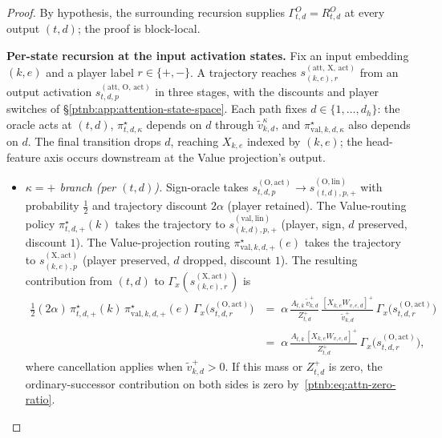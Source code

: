 \begin{proof}
By hypothesis, the surrounding recursion supplies $\Gamma^{O}_{t,d} = R^{O}_{t,d}$ at every
output $(t,d)$; the proof is block-local.

\textbf{Per-state recursion at the input activation states.} Fix an input embedding $(k,e)$ and a
player label $r \in \{+,-\}$. A trajectory reaches
$s_{(k,e),r}^{(\mathrm{att},\,\mathrm{X},\,\mathrm{act})}$ from an output activation
$s_{t,d,p}^{(\mathrm{att},\,\mathrm{O},\,\mathrm{act})}$ in three stages, with the discounts and player switches of
\S\ref{ptnb:app:attention-state-space}. Each path fixes $d \in \{1,\dots,d_h\}$:
the oracle acts at $(t,d)$, $\pi_{t,d,\kappa}^\star$ depends on $d$ through
$\tilde{v}_{k,d}^\kappa$, and $\pi_{\mathrm{val},k,d,\kappa}^\star$ also depends on $d$.
The final transition drops $d$, reaching $X_{k,e}$ indexed by $(k,e)$;
the head-feature axis occurs downstream at the Value projection's output.
\begin{itemize}
    \item \emph{$\kappa = +$ branch (per $(t,d)$).} Sign-oracle takes $s_{t,d,p}^{(\mathrm{O},\mathrm{act})}
            \to s_{(t,d),p,+}^{(\mathrm{O},\mathrm{lin})}$ with probability $\tfrac12$ and trajectory discount
        $2\alpha$ (player retained). The Value-routing policy $\pi_{t,d,+}^\star(k)$ takes the trajectory
        to $s_{(k,d),p,+}^{(\mathrm{val},\mathrm{lin})}$ (player, sign, $d$ preserved, discount $1$). The
        Value-projection routing $\pi_{\mathrm{val},k,d,+}^\star(e)$ takes the trajectory to
        $s_{(k,e),p}^{(\mathrm{X},\mathrm{act})}$ (player preserved, $d$ dropped, discount $1$). The resulting contribution from $(t,d)$ to $\Gamma_x(s_{(k,e),r}^{(\mathrm{X},\mathrm{act})})$ is
        \begin{align}
            \tfrac12 (2\alpha)\, \pi_{t,d,+}^\star(k)\, \pi_{\mathrm{val},k,d,+}^\star(e)\,
            \Gamma_x\!\bigl(s_{t,d,r}^{(\mathrm{O},\mathrm{act})}\bigr)
            &=\; \alpha\, \frac{A_{t,k}\, \tilde{v}_{k,d}^+}{Z_{t,d}^+}\,\frac{[X_{k,e}
            W_{v,e,d}]^+}{\tilde{v}_{k,d}^+}\, \Gamma_x\!\bigl(s_{t,d,r}^{(\mathrm{O},\mathrm{act})}\bigr) \\
            &=\; \alpha\, \frac{A_{t,k}\, [X_{k,e} W_{v,e,d}]^+}{Z_{t,d}^+}\,
            \Gamma_x\!\bigl(s_{t,d,r}^{(\mathrm{O},\mathrm{act})}\bigr),
        \end{align}
        where cancellation applies when $\tilde{v}_{k,d}^+>0$. If this mass or $Z_{t,d}^+$ is zero,
the ordinary-successor contribution on both sides is zero by~\eqref{ptnb:eq:attn-zero-ratio}.

\end{itemize}
\end{proof}
